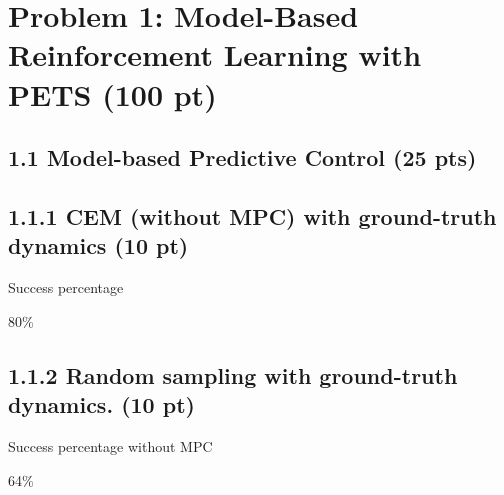 \documentclass[12pt]{article}
\begin{document}

\newpage
\section*{Problem 1: Model-Based Reinforcement Learning with PETS (100 pt)}
\subsection*{1.1 Model-based Predictive Control (25 pts)}

\subsection*{1.1.1 CEM (without MPC) with ground-truth dynamics (10 pt)}

Success percentage
\begin{tcolorbox}[fit,height=1cm, width=5cm, blank, borderline={1pt}{1pt},nobeforeafter]
\begin{center}
    80\%
\end{center}
\end{tcolorbox}

\subsection*{1.1.2 Random sampling with ground-truth dynamics. (10 pt)}

Success percentage without MPC 
\begin{tcolorbox}[fit,height=1cm, width=5cm, blank, borderline={1pt}{1pt},nobeforeafter]
\begin{center}
    64\%
\end{center}
\end{tcolorbox}
\end{document}
